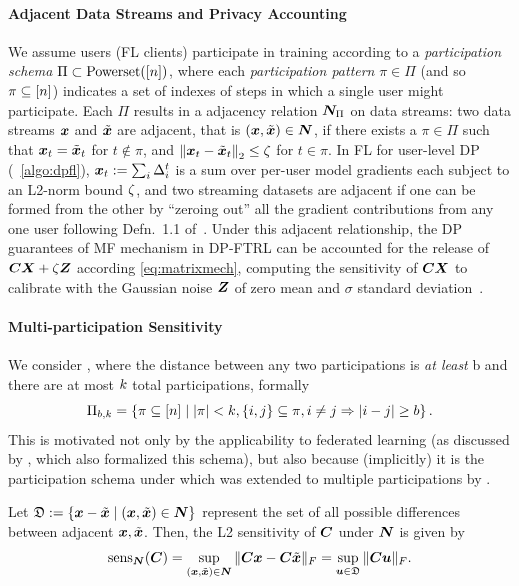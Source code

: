 \paragraph{Adjacent Data Streams and Privacy Accounting} We assume users (FL clients) participate in training according to a \emph{participation schema} $\Pi \subset \text{Powerset}([n])$, where each \emph{participation pattern} $\pi \in \Pi$ (and so $\pi \subseteq [n]$) indicates a set of indexes of steps in which a single user might participate. 
Each $\Pi$ results in a adjacency relation ${\bm{N}}_\Pi$ on data streams:
two data streams ${\bm{x}}$ and $\tilde{{\bm{x}}}$ are adjacent, that is $({\bm{x}}, \tilde{{\bm{x}}}) \in {\bm{N}}$, if there exists a $\pi \in \Pi$ such that ${\bm{x}}_t = \tilde{{\bm{x}}}_t$ for $t \notin \pi$, and $\left\|{{\bm{x}}_t - \tilde{{\bm{x}}}_t}\right\|_2 \le \zeta$ for $t \in \pi$. 
In FL for user-level DP (~\cref{algo:dpfl}), ${\bm{x}}_t:=\sum_i \Delta_i^t$ is a sum over per-user model gradients each subject to an L2-norm bound $\zeta$, and two streaming datasets are adjacent if one can be formed from the other by ``zeroing out'' all the gradient contributions from any one user following Defn.~1.1 of~\citet{kairouz21practical}.  
Under this adjacent relationship, the DP guarantees of MF mechanism in DP-FTRL can be accounted for the release of ${\bm{C}} {\bm{X}} + \zeta {\bm{Z}}$ according \cref{eq:matrixmech}, computing the sensitivity of ${\bm{C}} {\bm{X}}$ to calibrate with the Gaussian noise ${\bm{Z}}$ of zero mean and $\sigma$ standard deviation~\citep{choquette2023amplified}. 

\paragraph{Multi-participation Sensitivity} We consider \bparticipation, where the distance between any two participations is \emph{at least} b and there are at most $k$ total participations, formally 
\[
  \Pi_{b, k} = \left\{\pi \subseteq [n]  \mid |\pi| < k, \{i, j\} \subseteq \pi, i \ne j \Rightarrow |i - j| \ge b\right\}.
\]
This is motivated not only by the applicability to federated learning (as discussed by \citet{choquette2023amplified}, which also formalized this schema), but also because (implicitly) it is the participation schema under which \treeagg was extended to multiple participations by \citet{kairouz21practical}.

Let $\mathfrak{D} := \left\{ {\bm{x}} - \tilde{{\bm{x}}} \mid ({\bm{x}}, \tilde{{\bm{x}}}) \in {\bm{N}} \right\}$ represent the set of all possible differences between adjacent ${\bm{x}},\tilde{{\bm{x}}}$. Then, the L2 sensitivity of ${\bm{C}}$ under ${\bm{N}}$ is given by
\begin{equation}\label{eq:sensgeneral}
\operatorname{sens}_{{\bm{N}}}({\bm{C}}) = \sup_{({\bm{x}}, \tilde{{\bm{x}}}) \in {\bm{N}}} \| {\bm{C}} {\bm{x}} - {\bm{C}} \tilde{{\bm{x}}} \|_F
 = \sup_{{\bm{u}} \in \mathfrak{D}} \| {\bm{C}}{\bm{u}} \|_F. 
\end{equation}

